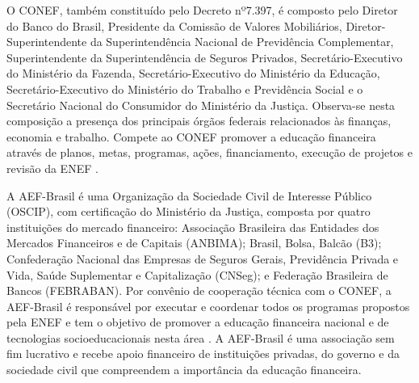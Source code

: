 O CONEF, também constituído pelo Decreto nº7.397, é composto pelo Diretor do Banco do Brasil, Presidente da Comissão de Valores Mobiliários, Diretor-Superintendente da Superintendência Nacional de Previdência Complementar, Superintendente da Superintendência de Seguros Privados, Secretário-Executivo do Ministério da Fazenda, Secretário-Executivo do Ministério da Educação, Secretário-Executivo do Ministério do Trabalho e Previdência Social e o Secretário Nacional do Consumidor do Ministério da Justiça. Observa-se nesta composição a presença dos principais órgãos federais relacionados às finanças, economia e trabalho. Compete ao CONEF promover a educação financeira através de planos, metas, programas, ações, financiamento, execução de projetos e revisão da ENEF \cite{brasil2010}.

A AEF-Brasil é uma Organização da Sociedade Civil de Interesse Público (OSCIP), com certificação do Ministério da Justiça, composta por quatro instituições do mercado financeiro: Associação Brasileira das Entidades dos Mercados Financeiros e de Capitais (ANBIMA); Brasil, Bolsa, Balcão (B3); Confederação Nacional das Empresas de Seguros Gerais, Previdência Privada e Vida, Saúde Suplementar e Capitalização (CNSeg); e Federação Brasileira de Bancos (FEBRABAN). Por convênio de cooperação técnica com o CONEF, a AEF-Brasil é responsável por executar e coordenar todos os programas propostos pela ENEF e tem o objetivo de promover a educação financeira nacional e de tecnologias socioeducacionais nesta área \cite{aefbrasil2011}. A AEF-Brasil é uma associação sem fim lucrativo e recebe apoio financeiro de instituições privadas, do governo e da sociedade civil que compreendem a importância da educação financeira.

